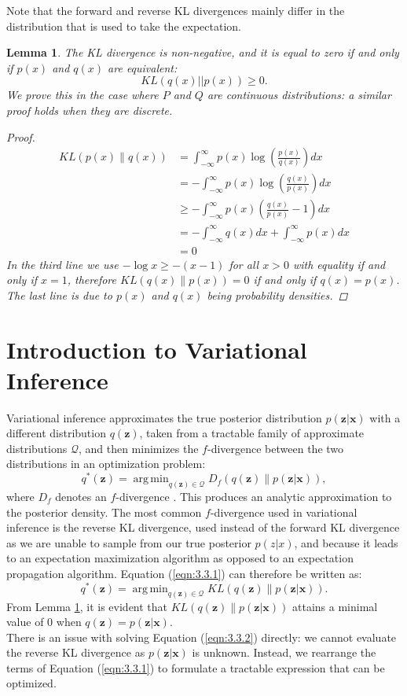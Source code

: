 \documentclass[honours,12pt]{unswthesis}
\DeclareMathOperator*{\argmin}{arg\,min}
\newtheorem{lemma}[theorem]{Lemma}
\numberwithin{equation}{section}
\theoremstyle{definition}
\begin{document}
Note that the forward and reverse KL divergences mainly differ in the distribution that is used to take the expectation.
\begin{lemma}\label{3.2.5}
The KL divergence is non-negative, and it is equal to zero if and only if $p(x)$ and $q(x)$ are equivalent:
\begin{equation*}
KL(q(x)||p(x))\geq 0.
\end{equation*}
We prove this in the case where $P$ and $Q$ are continuous distributions: a similar proof holds when they are discrete.
\begin{proof}
\begin{align*}
KL(p(x)\|q(x))&=\int_{-\infty}^\infty p(x)\log \left(\frac{p(x)}{q(x)}\right)dx\\
&=-\int_{-\infty}^\infty p(x)\log \left(\frac{q(x)}{p(x)}\right)dx\\
&\geq -\int_{-\infty}^\infty p(x) \left(\frac{q(x)}{p(x)}-1\right)dx\\
&=-\int_{-\infty}^\infty q(x)dx + \int_{-\infty}^\infty p(x)dx\\
&=0
\end{align*}
In the third line we use $-\log x \geq -(x-1)$ for all $x>0$ with equality if and only if $x=1$, therefore $KL(q(x)\|p(x))=0$ if and only if $q(x)=p(x)$. The last line is due to $p(x)$ and $q(x)$ being probability densities.
\end{proof}
\end{lemma}
\section{Introduction to Variational Inference}\label{sec:3.3}
Variational inference approximates the true posterior distribution $p(\bm{z}|\bm{x})$ with a different distribution $q(\bm{z})$, taken from a tractable family of approximate distributions $\mathcal{Q}$, and then minimizes the $f$-divergence between the two distributions in an optimization problem:
\begin{equation}\label{eqn:3.3.1}
q^*(\bm{z})=\argmin_{q(\bm{z})\in \mathcal{Q}}D_f(q(\bm{z})\|p(\bm{z}|\bm{x})),
\end{equation} where $D_f$ denotes an $f$-divergence \citep{blei}. This produces an analytic approximation to the posterior density. The most common $f$-divergence used in variational inference is the reverse KL divergence, used instead of the forward KL divergence as we are unable to sample from our true posterior $p(z|x)$, and because it leads to an expectation maximization algorithm as opposed to an expectation propagation algorithm. Equation (\ref{eqn:3.3.1}) can therefore be written as:
\begin{equation}\label{eqn:3.3.2}
q^*(\bm{z})=\argmin_{q(\bm{z})\in \mathcal{Q}}KL(q(\bm{z})\|p(\bm{z}|\bm{x})).
\end{equation}
From Lemma \ref{3.2.5}, it is evident that $KL(q(\bm{z})\|p(\bm{z}|\bm{x}))$ attains a minimal value of $0$ when $q(\bm{z})=p(\bm{z}|\bm{x})$.\\
There is an issue with solving Equation (\ref{eqn:3.3.2}) directly: we cannot evaluate the reverse KL divergence as $p(\bm{z}|\bm{x})$ is unknown. Instead, we rearrange the terms of Equation (\ref{eqn:3.3.1}) to formulate a tractable expression that can be optimized.
\end{document}
